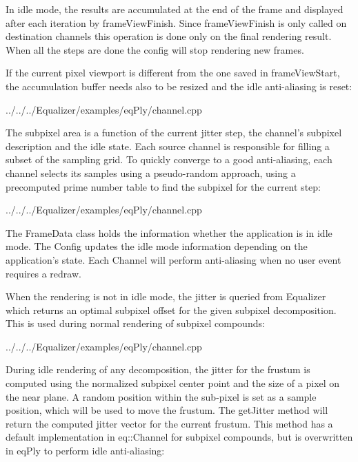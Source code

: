 \documentclass[10pt,a4]{scrartcl}
\begin{document}
In idle mode, the results are accumulated at the end of the frame and displayed
after each iteration by \textsf{frameViewFinish}. Since \textsf{frameViewFinish}
is only called on destination channels this operation is done only on the final
rendering result. When all the steps are done the config will stop rendering new
frames.

If the current pixel viewport is different from the one saved in
\textsf{frameViewStart}, the accumulation buffer needs also to be resized and
the idle anti-aliasing is reset:

{\footnotesize
  {../../../Equalizer/examples/eqPly/channel.cpp}}

The subpixel area is a function of the current jitter step, the channel's
\textsf{subpixel} description and the idle state. Each source channel is
responsible for filling a subset of the sampling grid. To quickly converge to a
good anti-aliasing, each channel selects its samples using a pseudo-random
approach, using a precomputed prime number table to find the subpixel for the
current step:

{\footnotesize
  {../../../Equalizer/examples/eqPly/channel.cpp}}

The \textsf{FrameData} class holds the information whether the application is in
idle mode. The \textsf{Config} updates the idle mode information depending on
the application's state.  Each \textsf{Channel} will perform anti-aliasing when
no user event requires a redraw.

When the rendering is not in idle mode, the jitter is queried from
Equalizer which returns an optimal subpixel offset for the given subpixel
decomposition. This is used during normal rendering of subpixel compounds:

{\footnotesize
  {../../../Equalizer/examples/eqPly/channel.cpp}}

During idle rendering of any decomposition, the jitter for the frustum is
computed using the normalized subpixel center point and the size of a pixel on
the near plane. A random position within the sub-pixel is set as a sample
position, which will be used to move the frustum. The \textsf{getJitter} method
will return the computed jitter vector for the current frustum. This method has
a default implementation in \textsf{eq::Channel} for subpixel compounds, but is
overwritten in \textsf{eqPly} to perform idle anti-aliasing:
\end{document}
